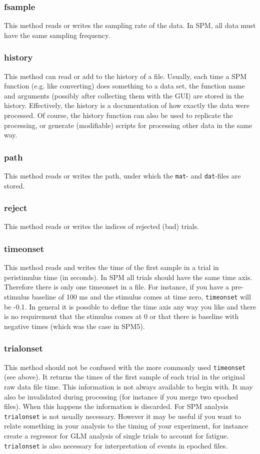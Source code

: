 \subsubsection{fsample}
This method reads or writes the sampling rate of the data. In SPM, all data must have the same sampling frequency.

\subsubsection{history}
This method can read or add to the history of a file. Usually, each time a SPM function (e.g. like converting) does something to a data set, the function name and arguments (possibly after collecting them with the GUI) are stored in the history. Effectively, the history is a documentation of how exactly the data were processed. Of course, the history function can also be used to replicate the processing, or generate (modifiable) scripts for processing other data in the same way.

\subsubsection{path}
This method reads or writes the path, under which the \texttt{mat}- and \texttt{dat}-files are stored.

\subsubsection{reject}
This method reads or writes the indices of rejected (bad) trials.

\subsubsection{timeonset}
This method reads and writes the time of the first sample in a trial in peristimulus time (in seconds). In SPM all trials should have the same time axis. Therefore there is only one timeonset in a file. For instance, if you have a pre-stimulus baseline of 100 ms and the stimulus comes at time zero, \texttt{timeonset} will be -0.1. In general it is possible to define the time axis any way you like and there is no requirement that the stimulus comes at 0 or that there is baseline with negative times (which was the case in SPM5).

\subsubsection{trialonset}
This method should not be confused with the more commonly used \texttt{timeonset} (see above). It returns the times of the first sample of each trial in the original raw data file time. This information is not always available to begin with. It may also be invalidated during processing (for instance if you merge two epoched files). When this happens the information is discarded. For SPM analysis \texttt{trialonset} is not usually necessary. However it may be useful if you want to relate something in your analysis to the timing of your experiment, for instance create a regressor for GLM analysis of single trials to account for fatigue. \texttt{trialonset} is also necessary for interpretation of events in epoched files.

